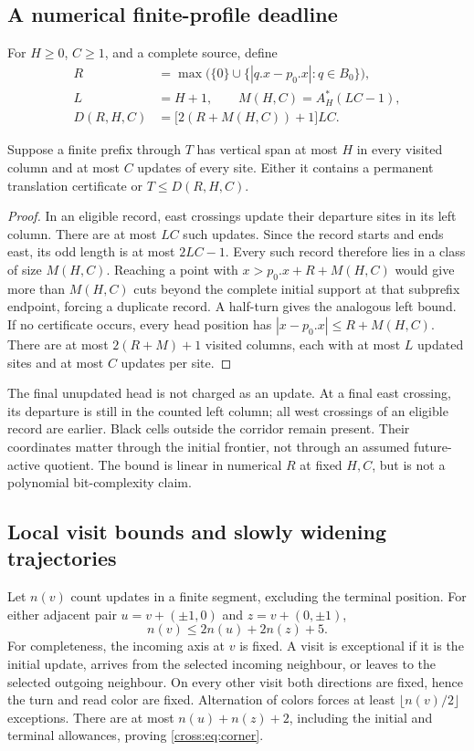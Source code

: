 \subsection{A numerical finite-profile deadline}
For $H\ge0$, $C\ge1$, and a complete source, define
\begin{align*}
 R&=\max\bigl(\{0\}\cup\{|q.x-p_0.x|:q\in B_0\}\bigr),\\
 L&=H+1,\qquad M(H,C)=A_H^*(LC-1),\\
 D(R,H,C)&=\bigl[2(R+M(H,C))+1\bigr]LC.
\end{align*}
\begin{theorem}\label{cross:thm:profile}
Suppose a finite prefix through $T$ has vertical span at most $H$ in every
visited column and at most $C$ updates of every site. Either it contains a
permanent translation certificate or $T\le D(R,H,C)$.
\end{theorem}
\begin{proof}
In an eligible record, east crossings update their departure sites in its left
column. There are at most $LC$ such updates. Since the record starts and ends
east, its odd length is at most $2LC-1$. Every such record therefore lies in a
class of size $M(H,C)$. Reaching a point with
$x>p_0.x+R+M(H,C)$ would give more than $M(H,C)$ cuts beyond the complete initial
support at that subprefix endpoint, forcing a duplicate record. A half-turn
gives the analogous left bound. If no certificate occurs, every head position
has $|x-p_0.x|\le R+M(H,C)$. There are at most $2(R+M)+1$ visited columns,
each with at most $L$ updated sites and at most $C$ updates per site.
\end{proof}
The final unupdated head is not charged as an update. At a final east crossing,
its departure is still in the counted left column; all west crossings of an
eligible record are earlier. Black cells outside the corridor remain present.
Their coordinates matter through the initial frontier, not through an assumed
future-active quotient. The bound is linear in numerical $R$ at fixed $H,C$,
but is not a polynomial bit-complexity claim.

\subsection{Local visit bounds and slowly widening trajectories}
Let $n(v)$ count updates in a finite segment, excluding the terminal position.
For either adjacent pair $u=v+(\pm1,0)$ and $z=v+(0,\pm1)$,
\begin{equation}
 n(v)\le2n(u)+2n(z)+5.\label{cross:eq:corner}
\end{equation}
For completeness, the incoming axis at $v$ is fixed. A visit is exceptional if
it is the initial update, arrives from the selected incoming neighbour, or
leaves to the selected outgoing neighbour. On every other visit both directions
are fixed, hence the turn and read color are fixed. Alternation of colors forces
at least $\lfloor n(v)/2\rfloor$ exceptions. There are at most $n(u)+n(z)+2$,
including the initial and terminal allowances, proving \eqref{cross:eq:corner}.

